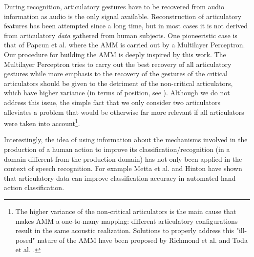 During recognition, articulatory gestures have to be recovered 
from audio information as audio is the only signal available.
Reconstruction of articulatory features has been attempted since a long
time, but in most cases it is not derived from articulatory \emph{data}
gathered from human subjects. One pioneeristic case is that of Papcun
et al. \cite{papcun} where the AMM is carried out by a Multilayer Perceptron.
Our procedure for building the AMM is deeply inspired by this work.
The Multilayer Perceptron tries to carry out the best recovery of all articulatory gestures while more emphasis to the recovery of the gestures of the critical articulators should be given to the detriment of the non-critical articulators, which have higher variance (in terms of position, see \cite{papcun,rose}). Although we do not address this issue, the simple fact that we only consider two articulators alleviates a problem that would be otherwise far more relevant if all articulators were taken into account\footnote{The higher variance of the non-critical articulators is the main cause that makes AMM a one-to-many mapping: different articulatory configurations result in the same acoustic realization. Solutions to properly address this "ill-posed" nature of the AMM have been proposed by Richmond et al. \cite{richmond} and Toda et al. \cite{toda}. }.


Interestingly, the idea of using information about the mechanisms involved in the production of a human action to improve its classification/recognition (in a domain different from the production domain) has not only been applied in the context of speech recognition. For example Metta et al. \cite{metta-06} and Hinton \cite{hinton-2006} 
have shown that articulatory data can improve classification accuracy in automated hand action classification.


